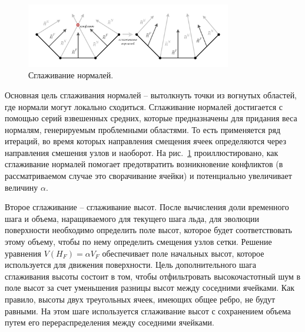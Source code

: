 \begin{figure}[ht]
\centering
\includegraphics[width=0.8\textwidth]{fig/3dr_normals_smooth.pdf}
\singlespacing
{}\caption{Сглаживание нормалей.}
\label{fig:text_1_remesh3_normals_smooth}
\end{figure}

Основная цель сглаживания нормалей -- вытолкнуть точки из вогнутых областей, где нормали могут локально сходиться.
Сглаживание нормалей достигается с помощью серий взвешенных средних, которые предназначены для придания веса нормалям, генерируемым проблемными областями.
То есть применяется ряд итераций, во время которых направления смещения ячеек определяются через направления смешения узлов и наоборот.
На рис.~\ref{fig:text_1_remesh3_normals_smooth} проиллюстировано, как сглаживание нормалей помогает предотвратить возникновение конфликтов (в рассматриваемом случае это сворачивание ячейки) и потенциально увеличивает величину $\alpha$.

Второе сглаживание -- сглаживание высот.
После вычисления доли временного шага и объема, наращиваемого для текущего шага льда, для эволюции поверхности необходимо определить поле высот, которое будет соответствовать этому объему, чтобы по нему определить смещения узлов сетки.
Решение уравнения $V(H_F) = \alpha V_F$ обеспечивает поле начальных высот, которое используется для движения поверхности.
Цель дополнительного шага сглаживания высоты состоит в том, чтобы отфильтровать высокочастотный шум в поле высот за счет уменьшения разницы высот между соседними ячейками.
Как правило, высоты двух треугольных ячеек, имеющих общее ребро, не будут равными.
На этом шаге используется сглаживание высот с сохранением объема путем его перераспределения между соседними ячейками.

